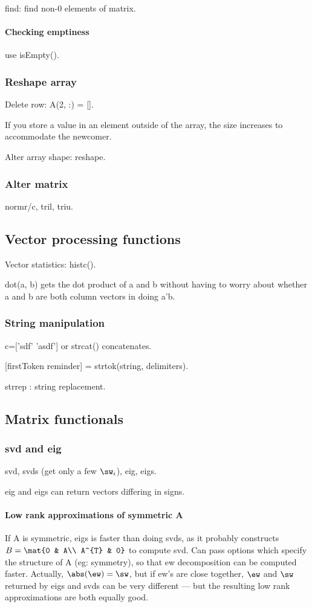 \documentclass[oneside, article]{memoir}
\begin{document}
find: find non-0 elements of matrix.

\paragraph*{Checking emptiness}
use isEmpty().

\subsubsection{Reshape array}
Delete row: A(2, :) = [].

If you store a value in an element outside of the array, the size increases to accommodate the newcomer.

Alter array shape: reshape.

\subsubsection{Alter matrix}
normr/c, tril, triu.

\subsection{Vector processing functions}
Vector statistics: histc().

dot(a, b) gets the dot product of a and b without having to worry about whether a and b are both column vectors in doing a'b.

\subsubsection{String manipulation}
c=['sdf' 'asdf'] or strcat() concatenates.

[firstToken reminder] = strtok(string, delimiters).

strrep : string replacement.

\subsection{Matrix functionals}
\subsubsection{svd and eig}
svd, svds (get only a few $\sw_i$), eig, eigs.

eig and eigs can return vectors differing in signs. \why

\paragraph*{Low rank approximations of symmetric A}
If A is symmetric, eigs is faster than doing svds, as it probably constructs $B = \mat{0 & A\\ A^{T} & 0}$ to compute svd. Can pass options which specify the structure of A (eg: symmetry), so that ew decomposition can be computed faster. Actually, $\abs(\ew) = \sw$, but if ew's are close together, $\ew$ and $\sw$ returned by eigs and svds can be very different --- but the resulting low rank approximations are both equally good.
\end{document}
